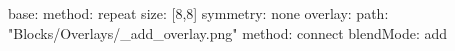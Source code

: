base:
  method: repeat
  size: [8,8]
  symmetry: none
overlay:
  path: "Blocks/Overlays/_add_overlay.png"
  method: connect
blendMode: add